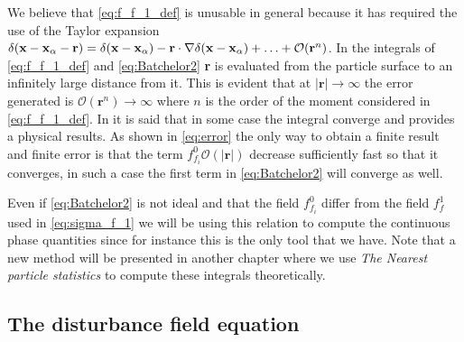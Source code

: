 We believe that \ref{eq:f_f_1_def} is unusable in general because it has required the use of the Taylor expansion $\delta(\textbf{x} - \textbf{x}_\alpha - \textbf{r}) =\delta(\textbf{x} - \textbf{x}_\alpha) - \textbf{r}\cdot \mathbf{\nabla}\delta(\textbf{x} - \textbf{x}_\alpha)+ \ldots + \mathcal{O}(\textbf{r}^n)$. 
In the integrals of \ref{eq:f_f_1_def} and \ref{eq:Batchelor2} \textbf{r} is evaluated from the particle surface to an infinitely large distance from it.
This is evident that at $|\textbf{r}| \to \infty$ the error generated is $\mathcal{O}(\textbf{r}^n) \to\infty$ where $n$ is the order of the moment considered in \ref{eq:f_f_1_def}. 
In  \citet{batchelor1972sedimentation} it is said that in some case the integral converge and provides a physical results. 
As shown in \ref{eq:error} the only way to obtain a finite result and finite error is that the term $f_{f_i}^0\mathcal{O}(|\textbf{r}|)$ decrease sufficiently fast so that it converges, in such a case the first term in \ref{eq:Batchelor2} will converge as well.  

Even if \ref{eq:Batchelor2} is not ideal and that the field $f_{f_i}^0$ differ from the field $f_f^1$ used in \ref{eq:sigma_f_1} we will be using this relation to compute the continuous phase quantities since for instance this is the only tool that we have. 
Note that a new method will be presented in another chapter where we use \textit{The Nearest particle statistics} to compute these integrals theoretically. 

\subsection{The disturbance field equation}

